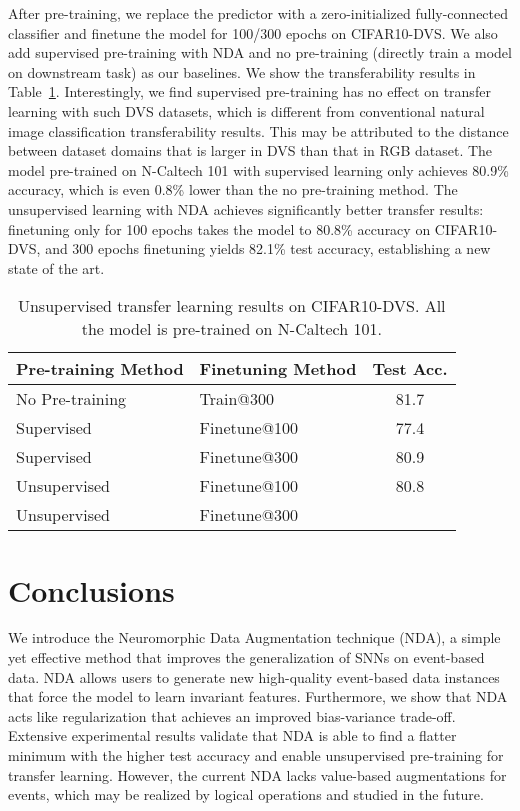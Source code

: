 \documentclass[runningheads]{llncs}
\newcommand{\bftab}{\fontseries{b}\selectfont}
\begin{document}
After pre-training, we replace the predictor with a zero-initialized fully-connected classifier and finetune the model for 100/300 epochs on CIFAR10-DVS. We also add supervised pre-training with NDA and no pre-training (\ie directly train a model on downstream task) as our baselines. We show the transferability results in Table~\ref{tab_ssl}. Interestingly, we find supervised pre-training has no effect on transfer learning with such DVS datasets, which is different from conventional natural image classification transferability results. This may be attributed to the distance between dataset domains that is larger in DVS than that in RGB dataset. The model pre-trained on N-Caltech 101 with supervised learning only achieves 80.9\% accuracy, which is even 0.8\% lower than the no pre-training method. The unsupervised learning with NDA achieves significantly better transfer results: finetuning only for 100 epochs takes the model to 80.8\% accuracy on CIFAR10-DVS, and 300 epochs finetuning yields 82.1\% test accuracy, establishing a new state of the art. 


\begin{table}[t]
\caption{Unsupervised transfer learning results on CIFAR10-DVS. All the model is pre-trained on N-Caltech 101. }
\centering
\begin{adjustbox}{max width=\linewidth}
\begin{tabular}[b]{l l c} 
\toprule 
{\bftab Pre-training Method} \:\:\:& {\bftab Finetuning Method} \:\:\: & {\bftab Test Acc.} \\
\midrule
No Pre-training & Train@300 & 81.7 \\
Supervised & Finetune@100 &  77.4 \\
Supervised & Finetune@300 &  80.9 \\
Unsupervised & Finetune@100 & 80.8 \\
Unsupervised & Finetune@300 & {\bftab 82.1} \\
\bottomrule
\end{tabular}
\end{adjustbox}
\label{tab_ssl}
\end{table}



\section{Conclusions}

We introduce the Neuromorphic Data Augmentation technique (NDA), a simple yet effective method that improves the generalization of SNNs on event-based data. 
NDA allows users to generate new high-quality event-based data instances that force the model to learn invariant features.     
Furthermore, we show that NDA acts like regularization that achieves an improved bias-variance trade-off.
Extensive experimental results validate that 
NDA is able to find a flatter minimum with the higher test accuracy and enable unsupervised pre-training for transfer learning. However, the current NDA lacks value-based augmentations for events, which may be realized by logical operations and studied in the future. 
\end{document}
